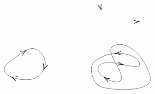 \documentclass[12pt]{article}
\begin{document}
\[\begin{tikzpicture}[x=0.75pt,y=0.75pt,yscale=-1,xscale=1]
    \draw [shift={(316.31,98.97)}, rotate = 176.13] [color={rgb, 255:red, 0; green, 0; blue, 0 }  ][line width=0.75]    (10.93,-3.29) .. controls (6.95,-1.4) and (3.31,-0.3) .. (0,0) .. controls (3.31,0.3) and (6.95,1.4) .. (10.93,3.29)   ;
    \draw [shift={(242.13,76.76)}, rotate = 252.08] [color={rgb, 255:red, 0; green, 0; blue, 0 }  ][line width=0.75]    (10.93,-3.29) .. controls (6.95,-1.4) and (3.31,-0.3) .. (0,0) .. controls (3.31,0.3) and (6.95,1.4) .. (10.93,3.29)   ;
    \draw    (60.26,180.14) .. controls (100.26,150.14) and (108.26,144.14) .. (124.26,159.14) .. controls (140.26,174.14) and (134.26,198.14) .. (114.26,208.14) .. controls (94.26,218.14) and (35.26,205.14) .. (60.26,180.14) -- cycle ;
    \draw [shift={(96.08,155.14)}, rotate = 149.89] [color={rgb, 255:red, 0; green, 0; blue, 0 }  ][line width=0.75]    (10.93,-4.9) .. controls (6.95,-2.3) and (3.31,-0.67) .. (0,0) .. controls (3.31,0.67) and (6.95,2.3) .. (10.93,4.9)   ;
    \draw [shift={(130.55,191.94)}, rotate = 289.75] [color={rgb, 255:red, 0; green, 0; blue, 0 }  ][line width=0.75]    (10.93,-4.9) .. controls (6.95,-2.3) and (3.31,-0.67) .. (0,0) .. controls (3.31,0.67) and (6.95,2.3) .. (10.93,4.9)   ;
    \draw [shift={(67.9,206.3)}, rotate = 19.51] [color={rgb, 255:red, 0; green, 0; blue, 0 }  ][line width=0.75]    (10.93,-4.9) .. controls (6.95,-2.3) and (3.31,-0.67) .. (0,0) .. controls (3.31,0.67) and (6.95,2.3) .. (10.93,4.9)   ;
    \draw    (230.26,175.14) .. controls (266,148.34) and (314.51,163.05) .. (316.59,180.75) .. controls (318.67,198.45) and (254.26,166.14) .. (238.26,184.14) .. controls (222.26,202.14) and (283.26,230.14) .. (281.26,207.14) .. controls (279.26,184.14) and (243.26,151.14) .. (271.26,144.14) .. controls (299.26,137.14) and (331.26,176.14) .. (337.26,207.14) .. controls (343.26,238.14) and (254.26,232.14) .. (239.26,224.14) .. controls (224.26,216.14) and (216.26,185.14) .. (230.26,175.14) -- cycle ;
    \draw [shift={(268.81,160.68)}, rotate = 357.68] [color={rgb, 255:red, 0; green, 0; blue, 0 }  ][line width=0.75]    (10.93,-3.29) .. controls (6.95,-1.4) and (3.31,-0.3) .. (0,0) .. controls (3.31,0.3) and (6.95,1.4) .. (10.93,3.29)   ;
    \draw [shift={(285.27,182.55)}, rotate = 191.28] [color={rgb, 255:red, 0; green, 0; blue, 0 }  ][line width=0.75]    (10.93,-3.29) .. controls (6.95,-1.4) and (3.31,-0.3) .. (0,0) .. controls (3.31,0.3) and (6.95,1.4) .. (10.93,3.29)   ;
    \draw [shift={(247.41,206.88)}, rotate = 31.32] [color={rgb, 255:red, 0; green, 0; blue, 0 }  ][line width=0.75]    (10.93,-3.29) .. controls (6.95,-1.4) and (3.31,-0.3) .. (0,0) .. controls (3.31,0.3) and (6.95,1.4) .. (10.93,3.29)   ;

\end{tikzpicture}\]
\end{document}
